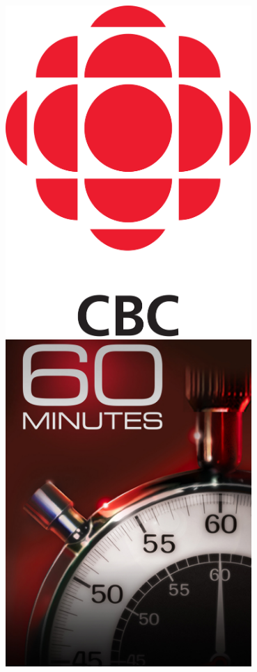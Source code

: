 \documentclass[10pt]{beamer}
\begin{document}
\begin{frame}[t]

	\begin{columns}[t]
		\begin{column}{0.33\textwidth}
			\begin{center}
				\includegraphics[width=0.7\textwidth]{figures/cbc.png}\\
				\vspace{1.5cm}
				\includegraphics[width=0.7\textwidth]{figures/60.jpg}
			\end{center}
		\end{column}
		

\end{columns}
\end{frame}
\end{document}
